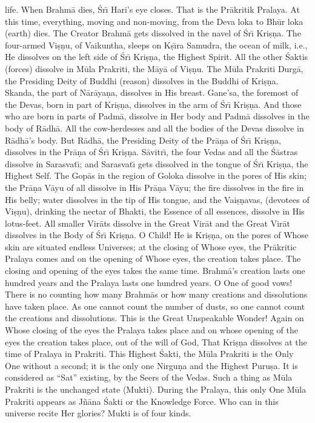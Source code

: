 life. When Brahm\=a dies, \'Sr\={\i} Hari's eye closes. That is the Pr\=akritik Pralaya. At this time, everything, moving and non-moving, from the Deva loka to Bh\=ur loka (earth) dies. The Creator Brahm\=a gets dissolved in the navel of \'Sr\={\i} Kri\d{s}\d{n}a. The four-armed Vi\d{s}\d{n}u, of Vaikuntha, sleeps on K\d{s}\={\i}ra Samudra, the ocean of milk, i.e., He dissolves on the left side of \'Sr\={\i} Kri\d{s}\d{n}a, the Highest Spirit. All the other \'Saktis (forces) dissolve in M\=ula Prakriti, the M\=ay\=a of Vi\d{s}\d{n}u. The M\=ula Prakriti Durg\=a, the Presiding Deity of Buddhi (reason) dissolves in the Buddhi of Kri\d{s}\d{n}a. Skanda, the part of N\=ar\=aya\d{n}a, dissolves in His breast. Gane'sa, the foremost of the Devas, born in part of Kri\d{s}\d{n}a, dissolves in the arm of \'Sr\={\i} Kri\d{s}\d{n}a. And those who are born in parts of Padm\=a, dissolve in Her body and Padm\=a dissolves in the body of R\=adh\=a. All the cow-herdesses and all the bodies of the Devas dissolve in R\=adh\=a's body. But R\=adh\=a, the Presiding Deity of the Pr\=a\d{n}a of \'Sr\={\i} Kri\d{s}\d{n}a, dissolves in the Pr\=a\d{n}a of \'Sr\={\i} Kri\d{s}\d{n}a. S\=avitr\={\i}, the four Vedas and all the \'S\=astras dissolve in Sarasvat\={\i}; and Sarasvat\={\i} gets dissolved in the tongue of \'Sr\={\i} Kri\d{s}\d{n}a, the Highest Self. The Gop\=as in the region of Goloka dissolve in the pores of His skin; the Pr\=a\d{n}a V\=ayu of all dissolve in His Pr\=a\d{n}a V\=ayu; the fire dissolves in the fire in His belly; water dissolves in the tip of His tongue, and the Vai\d{s}\d{n}avas, (devotees of Vi\d{s}\d{n}u), drinking the nectar of Bhakti, the Essence of all essences, dissolve in His lotus-feet. All smaller Vir\=ats dissolve in the Great Vir\=at and the Great Vir\=at dissolves in the Body of \'Sr\={\i} Kri\d{s}\d{n}a. O Child! He is Kri\d{s}\d{n}a, on the pores of Whose skin are situated endless Universes; at the closing of Whose eyes, the Pr\=akritic Pralaya comes and on the opening of Whose eyes, the creation takes place. The closing and opening of the eyes takes the same time. Brahm\=a's creation lasts one hundred years and the Pralaya lasts one hundred years. O One of good vows! There is no counting how many Brahm\=as or how many creations and dissolutions have taken place. As one cannot count the number of dusts, so one cannot count the creations and dissolutions. This is the Great Unspeakable Wonder! Again on Whose closing of the eyes the Pralaya takes place and on whose opening of the eyes the creation takes place, out of the will of God, That Kri\d{s}\d{n}a dissolves at the time of Pralaya in Prakriti. This Highest \'Sakti, the M\=ula Prakriti is the Only One without a second; it is the only one Nirgu\d{n}a and the Highest Puru\d{s}a. It is considered as ``Sat'' existing, by the Seers of the Vedas. Such a thing as M\=ula Prakriti is the unchanged state (Mukti). During the Pralaya, this only One M\=ula Prakriti appears as J\~n\=ana \'Sakti or the Knowledge Force. Who can in this universe recite Her glories? Mukti is of four kinds.

